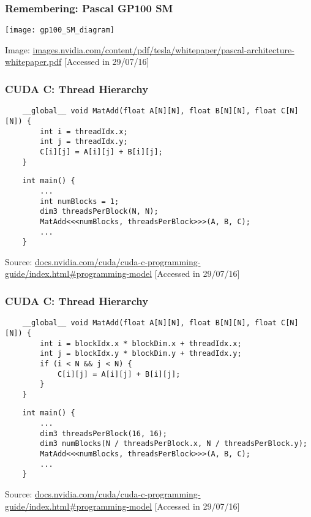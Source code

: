 \documentclass[10pt, compress]{beamer}
\begin{document}
\begin{frame}
    \frametitle{Remembering: Pascal GP100 SM}
    \centering
    \texttt{[image: gp100\_SM\_diagram]}

    \vfill

    \tiny{Image: \url{images.nvidia.com/content/pdf/tesla/whitepaper/pascal-architecture-whitepaper.pdf} [Accessed in 29/07/16]}
\end{frame}

\begin{frame}[fragile]
    \frametitle{CUDA C: Thread Hierarchy}
    \begin{lstlisting}
    __global__ void MatAdd(float A[N][N], float B[N][N], float C[N][N]) {
        int i = threadIdx.x;
        int j = threadIdx.y;
        C[i][j] = A[i][j] + B[i][j];
    }
    \end{lstlisting}

    \begin{lstlisting}
    int main() {
        ...
        int numBlocks = 1;
        dim3 threadsPerBlock(N, N);
        MatAdd<<<numBlocks, threadsPerBlock>>>(A, B, C);
        ...
    }
    \end{lstlisting}
    \vfill

    \begin{center}
        \tiny{Source: \url{docs.nvidia.com/cuda/cuda-c-programming-guide/index.html\#programming-model} [Accessed in 29/07/16]}
    \end{center}
\end{frame}

\begin{frame}[fragile]
    \frametitle{CUDA C: Thread Hierarchy}
    \begin{lstlisting}
    __global__ void MatAdd(float A[N][N], float B[N][N], float C[N][N]) {
        int i = blockIdx.x * blockDim.x + threadIdx.x;
        int j = blockIdx.y * blockDim.y + threadIdx.y;
        if (i < N && j < N) {
            C[i][j] = A[i][j] + B[i][j];
        }
    }
    \end{lstlisting}

    \begin{lstlisting}
    int main() {
        ...
        dim3 threadsPerBlock(16, 16);
        dim3 numBlocks(N / threadsPerBlock.x, N / threadsPerBlock.y);
        MatAdd<<<numBlocks, threadsPerBlock>>>(A, B, C);
        ...
    }
    \end{lstlisting}
    \vfill

    \begin{center}
        \tiny{Source: \url{docs.nvidia.com/cuda/cuda-c-programming-guide/index.html\#programming-model} [Accessed in 29/07/16]}
    \end{center}
\end{frame}
\end{document}
